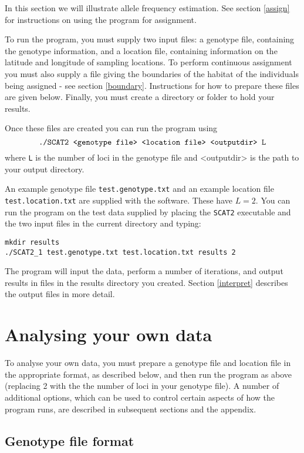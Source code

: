 \documentclass[10pt,titlepage,times,letterpaper]{article}
\def\SCAT{{\tt SCAT2} }
\begin{document}
In this section we will illustrate allele frequency estimation.
See section \ref{assign} for
instructions on using the program for assignment.

To run the program, you must supply two input files: a genotype file,
containing the genotype information, and a location file, containing
information on the latitude and longitude of sampling locations. To
perform continuous assignment you must also supply a file giving the
boundaries of the habitat of the individuals being assigned - see
section \ref{boundary}.  Instructions for how to prepare these files
are given below. Finally, you must create a directory or folder to hold your results.

Once these files are created you can run the program
using
$$\text{{\tt ./SCAT2 <genotype file> <location file> <outputdir> L}}$$ 
where {\tt L} is the number of loci in the genotype file and <outputdir>
is the path to your output directory.

An example genotype file {\tt test.genotype.txt}
and an example location file {\tt test.location.txt} are supplied with
the software.  These have $L=2$.  You can run the program on the test data supplied by placing
the \SCAT executable and the two input files in the current directory and typing:

{\flushleft
\tt{mkdir results}  \\
{\tt ./SCAT2\_1 test.genotype.txt test.location.txt results 2} \\
}

\medskip

The program will input the data, perform a number of iterations, and
output results in files in the results directory you created. 
Section \ref{interpret} describes the output files in more detail.

\section{Analysing your own data}

To analyse your own data, you must prepare a genotype file and
location file in the appropriate format, as described below, and then
run the program as above (replacing 2 with the 
the number of loci in your genotype file). A number of additional options, which
can be used to control certain aspects of how the program runs, are
described in subsequent sections and the appendix.

\subsection{Genotype file format} \label{inputfile}
\end{document}
